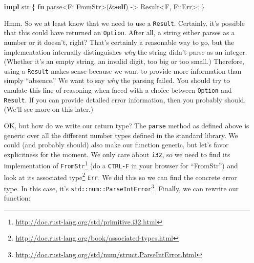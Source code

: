 \documentclass[a4paper,]{book}
\newenvironment{Shaded}{\begin{snugshade}}{\end{snugshade}}
\newcommand{\KeywordTok}[1]{\textcolor[rgb]{0.13,0.29,0.53}{\textbf{{#1}}}}
\newcommand{\DataTypeTok}[1]{\textcolor[rgb]{0.13,0.29,0.53}{{#1}}}
\newcommand{\ConstantTok}[1]{\textcolor[rgb]{0.00,0.00,0.00}{{#1}}}
\newcommand{\NormalTok}[1]{{#1}}
\renewcommand{\href}[2]{#2\footnote{\url{#1}}}
\begin{document}
\begin{Shaded}
\begin{Highlighting}[]
\KeywordTok{impl} \DataTypeTok{str} \NormalTok{\{}
    \KeywordTok{fn} \NormalTok{parse<F: FromStr>(&}\KeywordTok{self}\NormalTok{) -> }\DataTypeTok{Result}\NormalTok{<F, F::}\ConstantTok{Err}\NormalTok{>;}
\NormalTok{\}}
\end{Highlighting}
\end{Shaded}

Hmm. So we at least know that we need to use a \texttt{Result}.
Certainly, it's possible that this could have returned an
\texttt{Option}. After all, a string either parses as a number or it
doesn't, right? That's certainly a reasonable way to go, but the
implementation internally distinguishes \emph{why} the string didn't
parse as an integer. (Whether it's an empty string, an invalid digit,
too big or too small.) Therefore, using a \texttt{Result} makes sense
because we want to provide more information than simply ``absence.'' We
want to say \emph{why} the parsing failed. You should try to emulate
this line of reasoning when faced with a choice between \texttt{Option}
and \texttt{Result}. If you can provide detailed error information, then
you probably should. (We'll see more on this later.)

OK, but how do we write our return type? The \texttt{parse} method as
defined above is generic over all the different number types defined in
the standard library. We could (and probably should) also make our
function generic, but let's favor explicitness for the moment. We only
care about \texttt{i32}, so we need to
\href{http://doc.rust-lang.org/std/primitive.i32.html}{find its
implementation of \texttt{FromStr}} (do a \texttt{CTRL-F} in your
browser for ``FromStr'') and look at its
\href{http://doc.rust-lang.org/book/associated-types.html}{associated
type} \texttt{Err}. We did this so we can find the concrete error type.
In this case, it's
\href{http://doc.rust-lang.org/std/num/struct.ParseIntError.html}{\texttt{std::num::ParseIntError}}.
Finally, we can rewrite our function:
\end{document}
